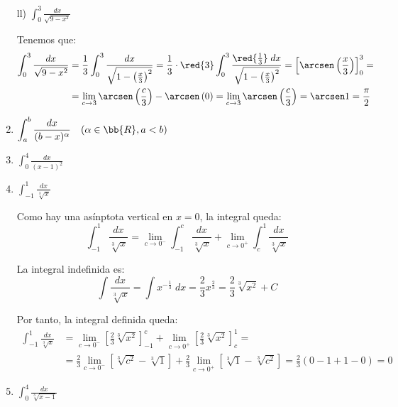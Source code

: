 \begin{ejercicio}
\begin{enumerate}
    \item[ll)] $\displaystyle \int_{0}^3 \frac{dx}{\sqrt{9-x^2}}$
    
    Tenemos que:
    \begin{align*}
        \int_{0}^3 \frac{dx}{\sqrt{9-x^2}}
        &= \frac{1}{3} \int_{0}^3 \frac{dx}{\sqrt{1-\left(\frac{x}{3}\right)^2}}
        = \frac{1}{3}\cdot\red{3} \int_{0}^3 \frac{\red{\frac{1}{3}}\;dx}{\sqrt{1-\left(\frac{x}{3}\right)^2}}
        = \left[\arcsen \left(\frac{x}{3}\right)\right]_0^3 =\\
        &= \lim_{c\to 3}\arcsen \left(\frac{c}{3}\right) - \arcsen \left(0\right)
        = \lim_{c\to 3}\arcsen \left(\frac{c}{3}\right) = \arcsen 1 = \frac{\pi}{2}
    \end{align*}
    \item $\displaystyle \int_{a}^{b} \frac{dx}{(b-x)^\alpha}\quad (\alpha\in \bb{R}, a<b)$
    \item $\displaystyle \int_{0}^{4} \frac{dx}{(x-1)^2}$
    \item $\displaystyle \int_{-1}^{1} \frac{dx}{\sqrt[3]{x}}$
    
    Como hay una asínptota vertical en $x=0$, la integral queda:
    \begin{equation*}
        \int_{-1}^{1} \frac{dx}{\sqrt[3]{x}} = \lim_{c\to 0^-}\int_{-1}^{c} \frac{dx}{\sqrt[3]{x}} + \lim_{c\to 0^+}\int_{c}^{1} \frac{dx}{\sqrt[3]{x}}
    \end{equation*}

    La integral indefinida es:
    \begin{equation*}
        \int \frac{dx}{\sqrt[3]{x}} = \int x^{-\frac{1}{3}}\;dx = \frac{2}{3}x^{\frac{2}{3}} = \frac{2}{3}\sqrt[3]{x^2}+C
    \end{equation*}

    Por tanto, la integral definida queda:
    \begin{align*}
        \int_{-1}^{1} \frac{dx}{\sqrt[3]{x}} &= \lim_{c\to 0^-}\left[\frac{2}{3}\sqrt[3]{x^2}\right]_{-1}^{c} + \lim_{c\to 0^+}\left[\frac{2}{3}\sqrt[3]{x^2}\right]_{c}^{1} =\\
        &= \frac{2}{3} \lim_{c\to 0^-}\left[\sqrt[3]{c^2}-\sqrt[3]{1}\right] + \frac{2}{3} \lim_{c\to 0^+}\left[\sqrt[3]{1}-\sqrt[3]{c^2}\right]
        = \frac{2}{3} \left(0-1+1-0\right) = 0
    \end{align*}

    \item $\displaystyle \int_{0}^{4} \frac{dx}{\sqrt[3]{x-1}}$
    

\end{enumerate}
\end{ejercicio}
